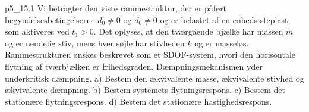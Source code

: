 
\begin{problemwithimage}{p5_1}{5.1}
  Vi betragter den viste rammestruktur, der er påført begyndelsesbetingelserne $d_0 \neq 0$ og $\dot{d}_0 \neq  0$ og er belastet af en enheds-steplast, som aktiveres ved $t_1 > 0$. 
  Det oplyses, at den tværgående bjælke har massen $m$ og er uendelig stiv, mens hver søjle har stivheden $k$ og er masseløs.
  Rammestrukturen ønskes beskrevet som et SDOF-system, hvori den horisontale flytning af tværbjælken er frihedsgraden.
  Dæmpningsmekanismen yder underkritisk dæmpning.
  a) Bestem den ækvivalente masse, ækvivalente stivhed og ækvivalente dæmpning.
  b) Bestem systemets flytningsrespons.
  c) Bestem det stationære flytningsrespons.
  d) Bestem det stationære hastighedsrespons.
\end{problemwithimage}


